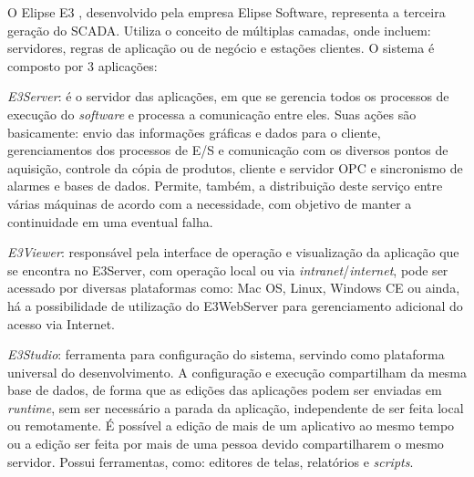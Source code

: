     O Elipse E3 \cite{Elipse}, desenvolvido pela empresa Elipse Software, representa a terceira geração do \gls{SCADA}. Utiliza o conceito de múltiplas camadas, onde incluem: servidores, regras de aplicação ou de negócio e estações clientes. O sistema é composto por 3 aplicações: 
    
    \begin{alineascomponto}
    	\item \textit{E3Server}: é o servidor das aplicações, em que se gerencia todos os processos de execução do \textit{software} e processa a comunicação entre eles. Suas ações são basicamente: envio das informações gráficas e dados para o cliente, gerenciamentos dos processos de E/S e comunicação com os diversos pontos de aquisição, controle da cópia de produtos, cliente e servidor OPC e sincronismo de alarmes e bases de dados. Permite, também, a distribuição deste serviço entre várias máquinas de acordo com a necessidade, com objetivo de manter a continuidade em uma eventual falha.
    	\item \textit{E3Viewer}: responsável pela interface de operação e visualização da aplicação que se encontra no E3Server, com operação local ou via \textit{intranet}/\textit{internet}, pode ser acessado por diversas plataformas como: Mac OS, Linux, Windows CE ou ainda, há a possibilidade de utilização do E3WebServer para gerenciamento adicional do acesso via Internet.
    	\item \textit{E3Studio}: ferramenta para configuração do sistema, servindo como plataforma universal do desenvolvimento. A configuração e execução compartilham da mesma base de dados, de forma que as edições das aplicações podem ser enviadas em \textit{runtime}, sem ser necessário a parada da aplicação, independente de ser feita local ou remotamente. É possível a edição de mais de um aplicativo ao mesmo tempo ou a edição ser feita por mais de uma pessoa devido compartilharem o mesmo servidor. Possui ferramentas, como: editores de telas, relatórios e \textit{scripts}.
    \end{alineascomponto}
    
    \begin{figure}[!h]
    \end{figure}

